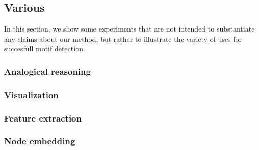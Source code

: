 \documentclass[11pt]{article}
\begin{document}
\subsection{Various}


In this section, we show some experiments that are not intended to substantiate any claims about our method, but rather to illustrate the variety of uses for succesfull motif detection. 

\subsubsection{Analogical reasoning}

\subsubsection{Visualization}

\subsubsection{Feature extraction}

\subsubsection{Node embedding}


\end{document}
